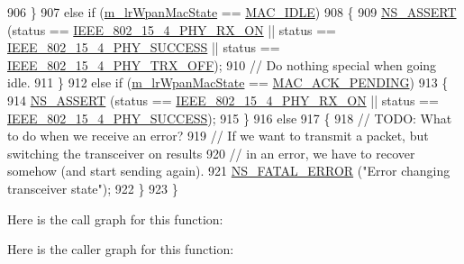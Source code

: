 \begin{DoxyCode}
906     \}
907   \textcolor{keywordflow}{else} \textcolor{keywordflow}{if} (\hyperlink{classns3_1_1LrWpanMac_ab5cdfd39de7397d658d300961dab3ed0}{m\_lrWpanMacState} == \hyperlink{group__lr-wpan_gga02ee7efd682937a8781f5e6101f61884a091c013ccdbce1011c1a4e141b227730}{MAC\_IDLE})
908     \{
909       \hyperlink{assert_8h_a6dccdb0de9b252f60088ce281c49d052}{NS\_ASSERT} (status == \hyperlink{group__lr-wpan_gga6494269d13d45c511a07b7ccbb1de754a9480f69fea1a74b7961ed74d6b3e2f9e}{IEEE\_802\_15\_4\_PHY\_RX\_ON} || status == 
      \hyperlink{group__lr-wpan_gga6494269d13d45c511a07b7ccbb1de754a2a81d56261f039e08cf2dd91de10b618}{IEEE\_802\_15\_4\_PHY\_SUCCESS} || status == 
      \hyperlink{group__lr-wpan_gga6494269d13d45c511a07b7ccbb1de754a4c0fd3882b68301deb8ce5b03109058f}{IEEE\_802\_15\_4\_PHY\_TRX\_OFF});
910       \textcolor{comment}{// Do nothing special when going idle.}
911     \}
912   \textcolor{keywordflow}{else} \textcolor{keywordflow}{if} (\hyperlink{classns3_1_1LrWpanMac_ab5cdfd39de7397d658d300961dab3ed0}{m\_lrWpanMacState} == \hyperlink{group__lr-wpan_gga02ee7efd682937a8781f5e6101f61884ae46a1e995082569f76cb986500770ab8}{MAC\_ACK\_PENDING})
913     \{
914       \hyperlink{assert_8h_a6dccdb0de9b252f60088ce281c49d052}{NS\_ASSERT} (status == \hyperlink{group__lr-wpan_gga6494269d13d45c511a07b7ccbb1de754a9480f69fea1a74b7961ed74d6b3e2f9e}{IEEE\_802\_15\_4\_PHY\_RX\_ON} || status == 
      \hyperlink{group__lr-wpan_gga6494269d13d45c511a07b7ccbb1de754a2a81d56261f039e08cf2dd91de10b618}{IEEE\_802\_15\_4\_PHY\_SUCCESS});
915     \}
916   \textcolor{keywordflow}{else}
917     \{
918       \textcolor{comment}{// TODO: What to do when we receive an error?}
919       \textcolor{comment}{// If we want to transmit a packet, but switching the transceiver on results}
920       \textcolor{comment}{// in an error, we have to recover somehow (and start sending again).}
921       \hyperlink{group__fatal_ga5131d5e3f75d7d4cbfd706ac456fdc85}{NS\_FATAL\_ERROR} (\textcolor{stringliteral}{"Error changing transceiver state"});
922     \}
923 \}
\end{DoxyCode}


Here is the call graph for this function\+:




Here is the caller graph for this function\+:


